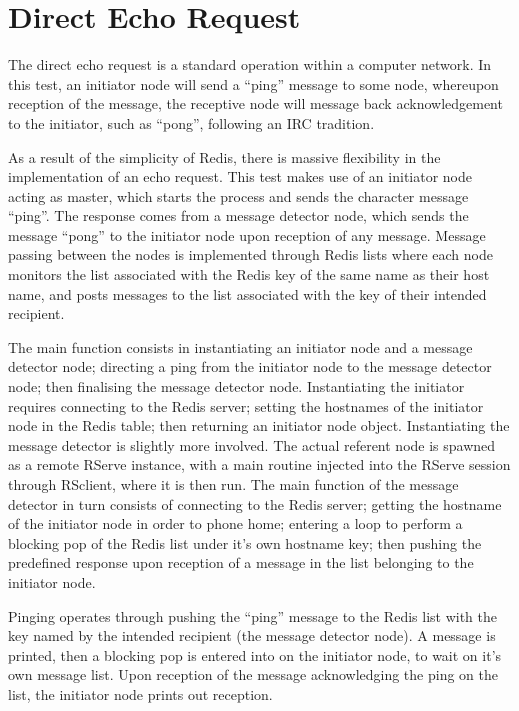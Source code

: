 \documentclass[10pt,a4paper]{article}
\begin{document}
\section{Direct Echo Request}
The direct echo request is a standard operation within a computer network\cite{rfc1122}.
In this test, an initiator node will send a ``ping'' message to some node, whereupon reception of the message, the receptive node will message back acknowledgement to the initiator, such as ``pong'', following an IRC tradition\cite{rfc1459}.

As a result of the simplicity of Redis, there is massive flexibility in the implementation of an echo request.
This test makes use of an initiator node acting as master, which starts the process and sends the character message ``ping''. The response comes from a message detector node, which sends the message ``pong'' to the initiator node upon reception of any message.
Message passing between the nodes is implemented through Redis lists where each node monitors the list associated with the Redis key of the same name as their host name, and posts messages to the list associated with the key of their intended recipient.

The main function consists in instantiating an initiator node and a message detector node; directing a ping from the initiator node to the message detector node; then finalising the message detector node.
Instantiating the initiator requires connecting to the Redis server; setting the hostnames of the initiator node in the Redis table; then returning an initiator node object.
Instantiating the message detector is slightly more involved. The actual referent node is spawned as a remote RServe instance, with a main routine injected into the RServe session through RSclient, where it is then run.
The main function of the message detector in turn consists of connecting to the Redis server; getting the hostname of the initiator node in order to phone home; entering a loop to perform a blocking pop of the Redis list under it's own hostname key; then pushing the predefined response upon reception of a message in the list belonging to the initiator node.

Pinging operates through pushing the ``ping'' message to the Redis list with the key named by the intended recipient (the message detector node). 
A message is printed, then a blocking pop is entered into on the initiator node, to wait on it's own message list. 
Upon reception of the message acknowledging the ping on the list, the initiator node prints out reception.
\end{document}
